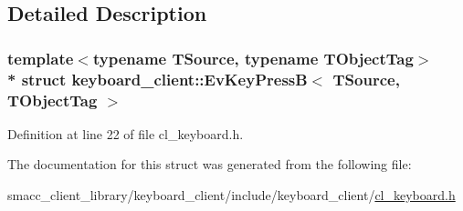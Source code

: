 \subsection{Detailed Description}
\subsubsection*{template$<$typename T\+Source, typename T\+Object\+Tag$>$\\*
struct keyboard\+\_\+client\+::\+Ev\+Key\+Press\+B$<$ T\+Source, T\+Object\+Tag $>$}



Definition at line 22 of file cl\+\_\+keyboard.\+h.



The documentation for this struct was generated from the following file\+:\begin{DoxyCompactItemize}
\item 
smacc\+\_\+client\+\_\+library/keyboard\+\_\+client/include/keyboard\+\_\+client/\hyperlink{cl__keyboard_8h}{cl\+\_\+keyboard.\+h}\end{DoxyCompactItemize}
